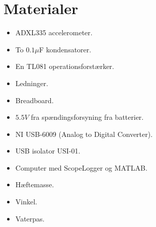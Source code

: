 \section{Materialer}
\begin{itemize}
\item ADXL335 accelerometer.
\item To $0.1\mu$F kondensatorer.
\item En TL081 operationsforstærker.
\item Ledninger.
\item Breadboard.
\item $5.5V$ fra spændingsforsyning fra batterier.
\item NI USB-6009 (Analog to Digital Converter).
\item USB isolator USI-01.
\item Computer med ScopeLogger og MATLAB.
\item Hæftemasse.
\item Vinkel.
\item Vaterpas.
\end{itemize}

